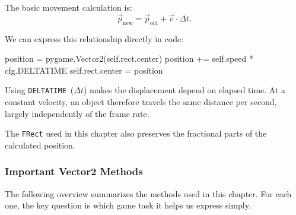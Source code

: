 The basic movement calculation is:
\[
\vec p_{\mathrm{new}}
=
\vec p_{\mathrm{old}}
+
\vec v \cdot \Delta t.
\]

We can express this relationship directly in code:

\begin{codebox}
position = pygame.Vector2(self.rect.center)
position += self.speed * cfg.DELTATIME
self.rect.center = position
\end{codebox}

Using \texttt{DELTATIME}~($\Delta t$) makes the displacement depend on elapsed time. At a constant velocity, an object therefore travels the same distance per second, largely independently of the frame rate.

The \texttt{FRect} used in this chapter also preserves the fractional parts of the calculated position.

\subsubsection*{Important Vector2 Methods}

The following overview summarizes the methods used in this chapter. For each one, the key question is which game task it helps us express simply.

